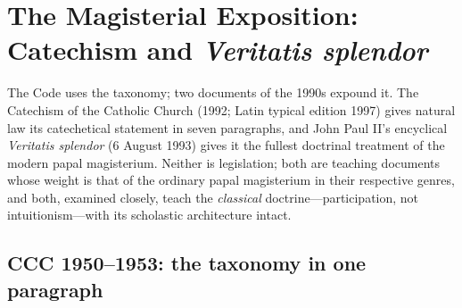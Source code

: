 \section{The Magisterial Exposition: Catechism and \emph{Veritatis splendor}}

The Code uses the taxonomy; two documents of the 1990s expound it. The Catechism of the Catholic Church (1992; Latin typical edition 1997) gives natural law its catechetical statement in seven paragraphs, and John Paul II's encyclical \emph{Veritatis splendor} (6 August 1993) gives it the fullest doctrinal treatment of the modern papal magisterium. Neither is legislation; both are teaching documents whose weight is that of the ordinary papal magisterium in their respective genres, and both, examined closely, teach the \emph{classical} doctrine---participation, not intuitionism---with its scholastic architecture intact.

\subsection{CCC 1950--1953: the taxonomy in one paragraph}

